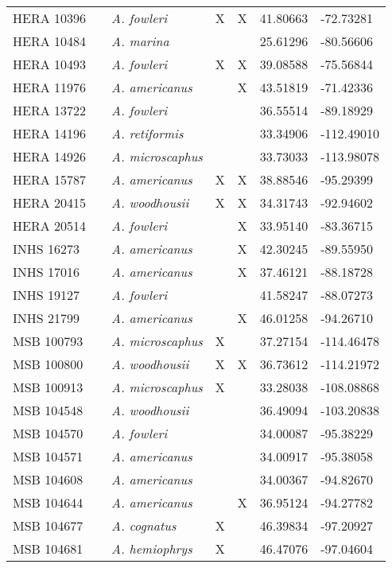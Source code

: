 \begin{longtable}{ lllllll }
HERA 10396 &  & \textit{A. fowleri} & X & X & 41.80663 & -72.73281 \\ 
HERA 10484 &  & \textit{A. marina} &  &  & 25.61296 & -80.56606 \\ 
HERA 10493 &  & \textit{A. fowleri} & X & X & 39.08588 & -75.56844 \\ 
HERA 11976 &  & \textit{A. americanus} &  & X & 43.51819 & -71.42336 \\ 
HERA 13722 &  & \textit{A. fowleri} &  &  & 36.55514 & -89.18929 \\ 
HERA 14196 &  & \textit{A. retiformis} &  &  & 33.34906 & -112.49010 \\ 
HERA 14926 &  & \textit{A. microscaphus} &  &  & 33.73033 & -113.98078 \\ 
HERA 15787 &  & \textit{A. americanus} & X & X & 38.88546 & -95.29399 \\ 
HERA 20415 &  & \textit{A. woodhousii} & X & X & 34.31743 & -92.94602 \\ 
HERA 20514 &  & \textit{A. fowleri} &  & X & 33.95140 & -83.36715 \\ 
INHS 16273 &  & \textit{A. americanus} &  & X & 42.30245 & -89.55950 \\ 
INHS 17016 &  & \textit{A. americanus} &  & X & 37.46121 & -88.18728 \\ 
INHS 19127 &  & \textit{A. fowleri} &  &  & 41.58247 & -88.07273 \\ 
INHS 21799 &  & \textit{A. americanus} &  & X & 46.01258 & -94.26710 \\ 
MSB 100793 &  & \textit{A. microscaphus} & X &  & 37.27154 & -114.46478 \\ 
MSB 100800 &  & \textit{A. woodhousii} & X & X & 36.73612 & -114.21972 \\ 
MSB 100913 &  & \textit{A. microscaphus} & X &  & 33.28038 & -108.08868 \\ 
MSB 104548 &  & \textit{A. woodhousii} &  &  & 36.49094 & -103.20838 \\ 
MSB 104570 &  & \textit{A. fowleri} &  &  & 34.00087 & -95.38229 \\ 
MSB 104571 &  & \textit{A. americanus} &  &  & 34.00917 & -95.38058 \\ 
MSB 104608 &  & \textit{A. americanus} &  &  & 34.00367 & -94.82670 \\ 
MSB 104644 &  & \textit{A. americanus} &  & X & 36.95124 & -94.27782 \\ 
MSB 104677 &  & \textit{A. cognatus} & X &  & 46.39834 & -97.20927 \\ 
MSB 104681 &  & \textit{A. hemiophrys} & X &  & 46.47076 & -97.04604 \\ 

\end{longtable}
